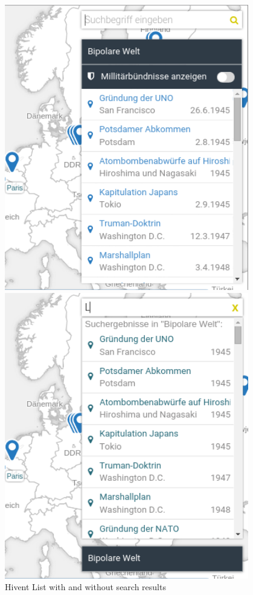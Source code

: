 \begin{figure}[H]
  \centering
  \begin{minipage}{0.45\textwidth}
    \includegraphics[width=0.95\textwidth]{graphics/hlsearch1.png}
  \end{minipage}
  \begin{minipage}{0.45\textwidth}
    \includegraphics[width=0.95\textwidth]{graphics/hlsearch2.png}
  \end{minipage}
  \caption{Hivent List with and without search results}
\end{figure}

